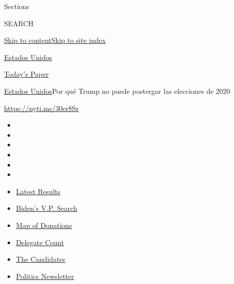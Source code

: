 Sections

SEARCH

\protect\hyperlink{site-content}{Skip to
content}\protect\hyperlink{site-index}{Skip to site index}

\href{https://www.nytimes.com/es/section/estados-unidos}{Estados Unidos}

\href{https://myaccount.nytimes.com/auth/login?response_type=cookie\&client_id=vi}{}

\href{https://www.nytimes.com/section/todayspaper}{Today's Paper}

\href{/es/section/estados-unidos}{Estados Unidos}\textbar{}Por qué Trump
no puede postergar las elecciones de 2020

\url{https://nyti.ms/30er8Sr}

\begin{itemize}
\item
\item
\item
\item
\item
\item
\end{itemize}

\begin{itemize}
\item
  \href{https://www.nytimes.com/interactive/2020/08/04/us/elections/results-arizona-kansas-michigan-missouri-primaries.html?action=click\&pgtype=Article\&state=default\&region=TOP_BANNER\&context=storylines_menu}{Latest
  Results}
\item
  \href{https://www.nytimes.com/article/biden-vice-president-2020.html?action=click\&pgtype=Article\&state=default\&region=TOP_BANNER\&context=storylines_menu}{Biden's
  V.P. Search}
\item
  \href{https://www.nytimes.com/interactive/2020/07/24/us/politics/trump-biden-campaign-donors.html?action=click\&pgtype=Article\&state=default\&region=TOP_BANNER\&context=storylines_menu}{Map
  of Donations}
\item
  \href{https://www.nytimes.com/interactive/2020/us/elections/delegate-count-primary-results.html?action=click\&pgtype=Article\&state=default\&region=TOP_BANNER\&context=storylines_menu}{Delegate
  Count}
\item
  \href{https://www.nytimes.com/interactive/2019/us/politics/2020-presidential-candidates.html?action=click\&pgtype=Article\&state=default\&region=TOP_BANNER\&context=storylines_menu}{The
  Candidates}
\item
  \href{https://www.nytimes.com/newsletters/politics?action=click\&pgtype=Article\&state=default\&region=TOP_BANNER\&context=storylines_menu}{Politics
  Newsletter}
\end{itemize}


